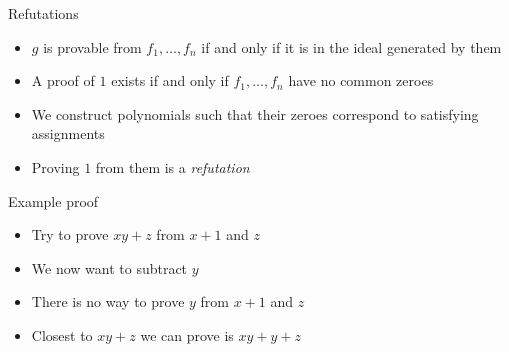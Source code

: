 \documentclass[xcolor={dvipsnames}, aspectratio=169]{beamer}
\begin{document}
\begin{frame}{Refutations}
    \begin{itemize}[<+->]
        \item $g$ is provable from $f_1, \ldots, f_n$ if and only if it is in the ideal generated by them
        \item A proof of $1$ exists if and only if $f_1, \ldots, f_n$ have no common zeroes
        \item We construct polynomials such that their zeroes correspond to satisfying assignments
        \item Proving $1$ from them is a \textit{refutation}
    \end{itemize}
\end{frame}

\begin{frame}{Example proof}
    \begin{itemize}[<+->]
        \item Try to prove $xy + z$ from $x + 1$ and $z$
    \end{itemize}
    \begin{itemize}[<+->]
        \item We now want to subtract $y$
        \item There is no way to prove $y$ from $x+1$ and $z$
        \item Closest to $xy + z$ we can prove is $xy + y + z$
    \end{itemize}
\end{frame}
\end{document}
